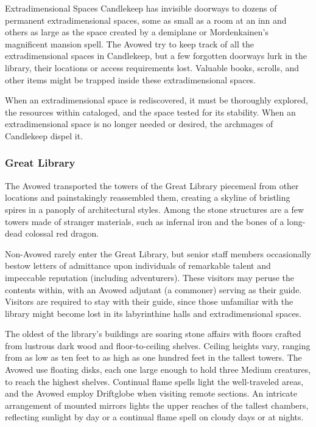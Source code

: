 \documentclass[10pt,a4paper,twoside,bg=print,twocolumn,openany,nodeprecatedcode]{dndbook}
\begin{document}
\begin{DndSidebar}[float=!b]{Extradimensional Spaces}
Candlekeep has invisible doorways to dozens of permanent extradimensional spaces, some as small as a room at an inn and others as large as the space created by a demiplane or Mordenkainen's magnificent mansion spell. The Avowed try to keep track of all the extradimensional spaces in Candlekeep, but a few forgotten doorways lurk in the library, their locations or access requirements lost. Valuable books, scrolls, and other items might be trapped inside these extradimensional spaces.



When an extradimensional space is rediscovered, it must be thoroughly explored, the resources within cataloged, and the space tested for its stability. When an extradimensional space is no longer needed or desired, the archmages of Candlekeep dispel it.



\end{DndSidebar}

\subsubsection{Great Library}
The Avowed transported the towers of the Great Library piecemeal from other locations and painstakingly reassembled them, creating a skyline of bristling spires in a panoply of architectural styles. Among the stone structures are a few towers made of stranger materials, such as infernal iron and the bones of a long-dead colossal red dragon.

Non-Avowed rarely enter the Great Library, but senior staff members occasionally bestow letters of admittance upon individuals of remarkable talent and impeccable reputation (including adventurers). These visitors may peruse the contents within, with an Avowed adjutant (a commoner) serving as their guide. Visitors are required to stay with their guide, since those unfamiliar with the library might become lost in its labyrinthine halls and extradimensional spaces.

The oldest of the library's buildings are soaring stone affairs with floors crafted from lustrous dark wood and floor-to-ceiling shelves. Ceiling heights vary, ranging from as low as ten feet to as high as one hundred feet in the tallest towers. The Avowed use floating disks, each one large enough to hold three Medium creatures, to reach the highest shelves. Continual flame spells light the well-traveled areas, and the Avowed employ Driftglobe when visiting remote sections. An intricate arrangement of mounted mirrors lights the upper reaches of the tallest chambers, reflecting sunlight by day or a continual flame spell on cloudy days or at nights.
\end{document}
